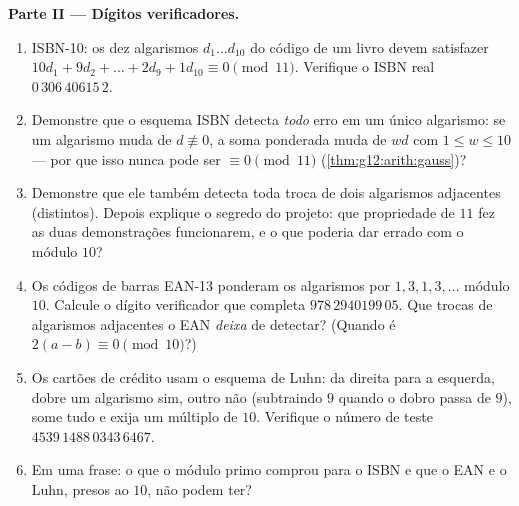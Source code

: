 \begin{problem}
\medskip
\noindent\textbf{Parte II --- Dígitos verificadores.}
\begin{enumerate}[resume]
  \item ISBN-10: os dez algarismos $d_1 \dots d_{10}$ do código
        de um livro devem satisfazer
        $10d_1 + 9d_2 + \dots + 2d_9 + 1d_{10} \equiv 0
        \pmod{11}$. Verifique o ISBN real
        $0\,306\,40615\,2$.
  \item Demonstre que o esquema ISBN detecta \emph{todo} erro em
        um único algarismo: se um algarismo muda de
        $d \not\equiv 0$, a soma ponderada muda de $w d$ com
        $1 \leq w \leq 10$ --- por que isso nunca pode ser
        $\equiv 0 \pmod{11}$ (\cref{thm:g12:arith:gauss})?
  \item Demonstre que ele também detecta toda troca de dois
        algarismos adjacentes (distintos). Depois explique o
        segredo do projeto: que propriedade de $11$ fez as duas
        demonstrações funcionarem, e o que poderia dar errado com
        o módulo $10$?
  \item Os códigos de barras EAN-13 ponderam os algarismos por
        $1, 3, 1, 3, \dots$ módulo $10$. Calcule o dígito
        verificador que completa $978\,2940199\,05$. Que trocas
        de algarismos adjacentes o EAN \emph{deixa} de detectar?
        (Quando é $2(a - b) \equiv 0 \pmod{10}$?)
  \item Os cartões de crédito usam o esquema de Luhn: da direita
        para a esquerda, dobre um algarismo sim, outro não
        (subtraindo $9$ quando o dobro passa de $9$), some tudo e
        exija um múltiplo de $10$. Verifique o número de teste
        $4539\,1488\,0343\,6467$.
  \item Em uma frase: o que o módulo primo comprou para o ISBN e
        que o EAN e o Luhn, presos ao $10$, não podem ter?
\end{enumerate}


\end{problem}
